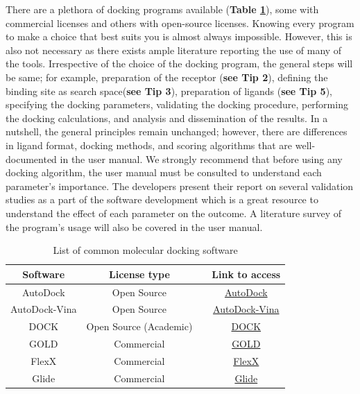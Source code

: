 \documentclass[10pt, a4paper]{book}
\begin{document}

There are a plethora of docking programs available (\textbf{Table \ref{tab:List}}), some with commercial licenses and others with open-source licenses. Knowing every program to make a choice that best suits you is almost always impossible. However, this is also not necessary as there exists ample literature reporting the use of many of the tools. Irrespective of the choice of the docking program, the general steps will be same; for example, preparation of the receptor (\textbf{see  Tip 2}), defining the binding site as search space(\textbf{see Tip 3}), preparation of ligands (\textbf{see Tip 5}), specifying the docking parameters, validating the docking procedure, performing the docking calculations, and analysis and dissemination of the results.  In a nutshell, the general principles remain unchanged; however, there are differences in ligand format, docking methods, and scoring algorithms that are well-documented in the user manual. We strongly recommend that before using any docking algorithm, the user manual must be consulted to understand each parameter's importance. The developers present their report on several validation studies as a part of the software development which is a great resource to understand the effect of each parameter on the outcome. A literature survey of the program's usage will also be covered in the user manual. 

\begin{table}[ht]
    \centering
    \caption{List of common molecular docking software}
    \label{tab:List}
    \begin{tabular}{|c|c|c|c|}
    \hline
         \textbf{Software} & \textbf{License type} & {\color{red}{\textbf{Scoring Function}}} & \textbf{Link to access} \\
    \hline
        AutoDock & Open Source & {\color{red}{Force field}} & \href{https://autodock.scripps.edu/download-autodock4/}{AutoDock}  \\
        AutoDock-Vina & Open Source &{\color{red}{Empirical}} & \href{https://github.com/ccsb-scripps/AutoDock-Vina/releases}{AutoDock-Vina}  \\
        DOCK & Open Source (Academic) & {\color{red}{Force field}}  & \href{https://dock.compbio.ucsf.edu}{DOCK}  \\
        GOLD &  Commercial & {\color{red}{Multiple options}} & \href{https://www.ccdc.cam.ac.uk/solutions/software/gold/}{GOLD} \\
        FlexX &  Commercial & {\color{red}{Empirical}}   & \href{https://www.biosolveit.de/products/#FlexX}{FlexX}  \\
        Glide &  Commercial & {\color{red}{Empirical}}  & \href{https://www.schrodinger.com/platform/products/glide/}{Glide} \\
    \hline
    \end{tabular}
\end{table}
\end{document}
